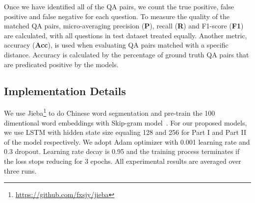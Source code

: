 Once we have identified all of the QA pairs, we count the true positive, 
false positive and false negative for each question. 
To measure the quality of the matched QA pairs, micro-averaging 
precision (\textbf{P}), recall (\textbf{R}) and F1-score (\textbf{F1}) are 
calculated,  with all questions in test dataset treated equally. 
Another metric, accuracy (\textbf{Acc}), is used when evaluating QA pairs matched
with a specific distance. Accuracy is calculated by the percentage of ground
truth QA pairs that are predicated positive by the models.

\subsection{Implementation Details}
 
We use Jieba\footnote{\url{https://github.com/fxsjy/jieba}} to do Chinese word segmentation and pre-train the 100 dimentional word embeddings with Skip-gram model~\cite{mikolov2013efficient}. For our proposed models, we use LSTM with hidden state size equaling 128 and 256 for Part I and Part II of the model respectively. We adopt Adam optimizer with 0.001 learning rate and 0.3 dropout. 
Learning rate decay is 0.95 and the training process terminates if the 
loss stops reducing for 3 epochs. All experimental results are 
averaged over three runs.
